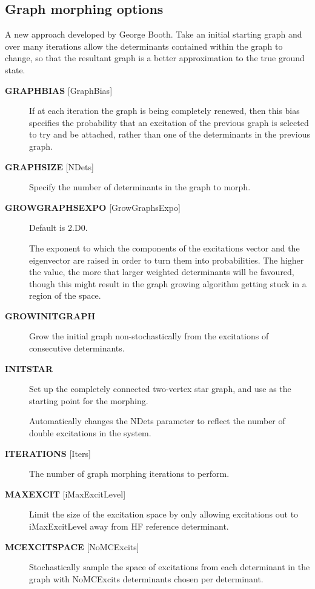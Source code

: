 \documentclass[openany,a4paper,10pt]{manual}
\begin{document}
\subsection{Graph morphing options}

A new approach developed by George Booth.  Take an initial starting graph
and over many iterations allow the determinants contained within the
graph to change, so that the resultant graph is a better approximation
to the true ground state.
\begin{description}
\item[\textbf{GRAPHBIAS} {[}GraphBias{]}]
If at each iteration the graph is being completely renewed, then this
bias specifies the probability that an excitation of the previous
graph is selected to try and be attached, rather than one of the
determinants in the previous graph.

\item[\textbf{GRAPHSIZE} {[}NDets{]}]
Specify the number of determinants in the graph to morph.

\item[\textbf{GROWGRAPHSEXPO} {[}GrowGraphsExpo{]}]
Default is 2.D0.

The exponent to which the components of the excitations vector
and the eigenvector are raised in order to turn them into
probabilities. The higher the value, the more that larger weighted
determinants will be favoured, though this might result in the graph
growing algorithm getting stuck in a region of the space.

\item[\textbf{GROWINITGRAPH}]
Grow the initial graph non-stochastically from the excitations of
consecutive determinants.

\item[\textbf{INITSTAR}]
Set up the completely connected two-vertex star graph, and use as
the starting point for the morphing.

Automatically changes the NDets parameter to reflect the number of
double excitations in the system.

\item[\textbf{ITERATIONS} {[}Iters{]}]
The number of graph morphing iterations to perform.

\item[\textbf{MAXEXCIT} {[}iMaxExcitLevel{]}]
Limit the size of the excitation space by only allowing excitations
out to iMaxExcitLevel away from HF reference determinant.

\item[\textbf{MCEXCITSPACE} {[}NoMCExcits{]}]
Stochastically sample the space of excitations from each determinant in the
graph with NoMCExcits determinants chosen per determinant.


\end{description}
\end{document}

